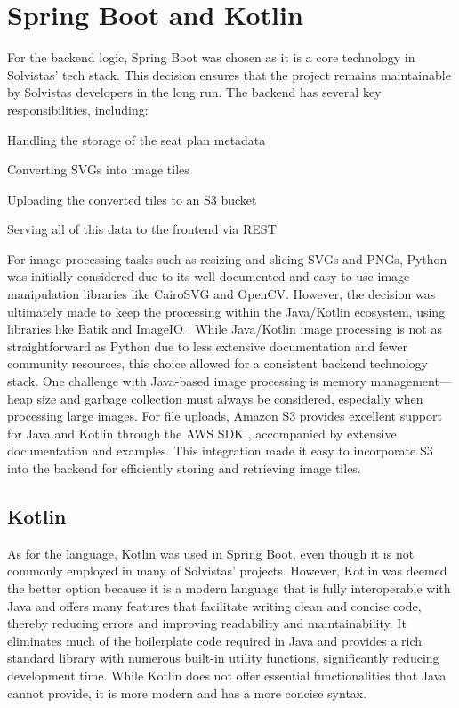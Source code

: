 \section{Spring Boot and Kotlin}
For the backend logic, Spring Boot was chosen as it is a core technology in Solvistas' tech stack. This decision ensures that the project remains maintainable by Solvistas developers in the long run. The backend has several key responsibilities, including:
\begin{compactitem}
    \item Handling the storage of the seat plan metadata
    \item Converting SVGs into image tiles
    \item Uploading the converted tiles to an S3 bucket
    \item Serving all of this data to the frontend via REST
\end{compactitem}

For image processing tasks such as resizing and slicing SVGs and PNGs, Python was initially considered due to its well-documented and easy-to-use image manipulation libraries like CairoSVG and OpenCV. However, the decision was ultimately made to keep the processing within the Java/Kotlin ecosystem, using libraries like Batik \cite{BatikDocs} and ImageIO \cite{JavaImageIODocs}. While Java/Kotlin image processing is not as straightforward as Python due to less extensive documentation and fewer community resources, this choice allowed for a consistent backend technology stack. One challenge with Java-based image processing is memory management—heap size and garbage collection must always be considered, especially when processing large images. For file uploads, Amazon S3 provides excellent support for Java and Kotlin through the AWS SDK \cite{AWSKotlinSDK}, accompanied by extensive documentation and examples. This integration made it easy to incorporate S3 into the backend for efficiently storing and retrieving image tiles.

\subsection{Kotlin}
As for the language, Kotlin was used in Spring Boot, even though it is not commonly employed in many of Solvistas' projects. However, Kotlin was deemed the better option because it is a modern language that is fully interoperable with Java and offers many features that facilitate writing clean and concise code, thereby reducing errors and improving readability and maintainability. It eliminates much of the boilerplate code required in Java and provides a rich standard library with numerous built-in utility functions, significantly reducing development time. While Kotlin does not offer essential functionalities that Java cannot provide, it is more modern and has a more concise syntax.

